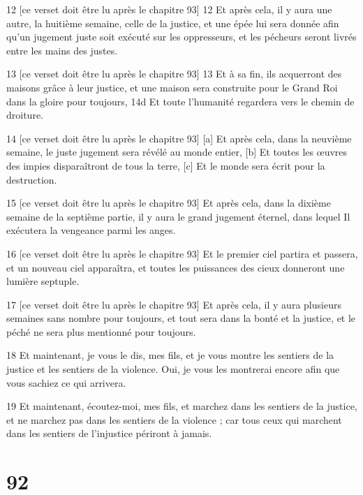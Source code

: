 \par 12 [ce verset doit être lu après le chapitre 93] 12 Et après cela, il y aura une autre, la huitième semaine, celle de la justice, et une épée lui sera donnée afin qu'un jugement juste soit exécuté sur les oppresseurs, et les pécheurs seront livrés entre les mains des justes.
\par 13 [ce verset doit être lu après le chapitre 93] 13 Et à sa fin, ils acquerront des maisons grâce à leur justice, et une maison sera construite pour le Grand Roi dans la gloire pour toujours, 14d Et toute l'humanité regardera vers le chemin de droiture.
\par 14 [ce verset doit être lu après le chapitre 93] [a] Et après cela, dans la neuvième semaine, le juste jugement sera révélé au monde entier, [b] Et toutes les œuvres des impies disparaîtront de tous la terre, [c] Et le monde sera écrit pour la destruction.
\par 15 [ce verset doit être lu après le chapitre 93] Et après cela, dans la dixième semaine de la septième partie, il y aura le grand jugement éternel, dans lequel Il exécutera la vengeance parmi les anges.
\par 16 [ce verset doit être lu après le chapitre 93] Et le premier ciel partira et passera, et un nouveau ciel apparaîtra, et toutes les puissances des cieux donneront une lumière septuple.
\par 17 [ce verset doit être lu après le chapitre 93] Et après cela, il y aura plusieurs semaines sans nombre pour toujours, et tout sera dans la bonté et la justice, et le péché ne sera plus mentionné pour toujours.
\par 18 Et maintenant, je vous le dis, mes fils, et je vous montre les sentiers de la justice et les sentiers de la violence. Oui, je vous les montrerai encore afin que vous sachiez ce qui arrivera.
\par 19 Et maintenant, écoutez-moi, mes fils, et marchez dans les sentiers de la justice, et ne marchez pas dans les sentiers de la violence ; car tous ceux qui marchent dans les sentiers de l’injustice périront à jamais.

\chapter{92}


